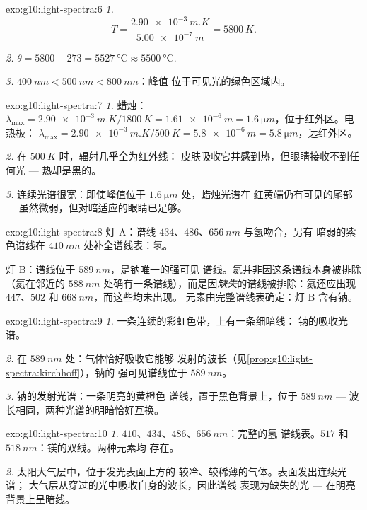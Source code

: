 \begin{solution}{exo:g10:light-spectra:6}
\emph{1.}
\[
T = \frac{\qty{2.90e-3}{m.K}}{\qty{5.00e-7}{m}} = \qty{5800}{K}.
\]

\emph{2.} $\theta = 5800 - 273 = \qty{5527}{\degreeCelsius} \approx
\qty{5500}{\degreeCelsius}$.

\emph{3.} $\qty{400}{nm} < \qty{500}{nm} < \qty{800}{nm}$：峰值
位于可见光的绿色区域内。
\end{solution}

\begin{solution}{exo:g10:light-spectra:7}
\emph{1.} 蜡烛：
$\lambda_{\max} = \qty{2.90e-3}{m.K} / \qty{1800}{K} = \qty{1.61e-6}{m}
= \qty{1.6}{\micro m}$，位于红外区。电热板：
$\lambda_{\max} = \qty{2.90e-3}{m.K} / \qty{500}{K} = \qty{5.8e-6}{m}
= \qty{5.8}{\micro m}$，远红外区。

\emph{2.} 在 $\qty{500}{K}$ 时，辐射几乎全为红外线：
皮肤吸收它并感到热，但眼睛接收不到任何光 ---
热却是黑的。

\emph{3.} 连续光谱很宽：即使峰值位于
$\qty{1.6}{\micro m}$ 处，蜡烛光谱在
红黄端仍有可见的尾部 --- 虽然微弱，但对暗适应的眼睛已足够。
\end{solution}

\begin{solution}{exo:g10:light-spectra:8}
灯 A：谱线 $434$、$486$、$\qty{656}{nm}$ 与氢吻合，另有
暗弱的紫色谱线在 $\qty{410}{nm}$ 处补全谱线表：氢。

灯 B：谱线位于 $\qty{589}{nm}$，是钠唯一的强可见
谱线。氦并非因这条谱线本身被排除（氦在邻近的
$\qty{588}{nm}$ 处确有一条谱线），而是因\emph{缺失}的谱线被排除：氦还应出现
$447$、$502$ 和 $\qty{668}{nm}$，而这些均未出现。
元素由完整谱线表确定：灯 B 含有钠。
\end{solution}

\begin{solution}{exo:g10:light-spectra:9}
\emph{1.} 一条连续的彩虹色带，上有一条细暗线：
钠的吸收光谱。

\emph{2.} 在 $\qty{589}{nm}$ 处：气体恰好吸收它能够
发射的波长（见\cref{prop:g10:light-spectra:kirchhoff}），钠的
强可见谱线位于 $\qty{589}{nm}$。

\emph{3.} 钠的发射光谱：一条明亮的黄橙色
谱线，置于黑色背景上，位于 $\qty{589}{nm}$ ---
波长相同，两种光谱的明暗恰好互换。
\end{solution}

\begin{solution}{exo:g10:light-spectra:10}
\emph{1.} $410$、$434$、$486$、$\qty{656}{nm}$：完整的氢
谱线表。$517$ 和 $\qty{518}{nm}$：镁的双线。两种元素均
存在。

\emph{2.} 太阳大气层中，位于发光表面上方的
较冷、较稀薄的气体。表面发出连续光谱；
大气层从穿过的光中吸收自身的波长，因此谱线
表现为缺失的光 --- 在明亮背景上呈暗线。
\end{solution}

